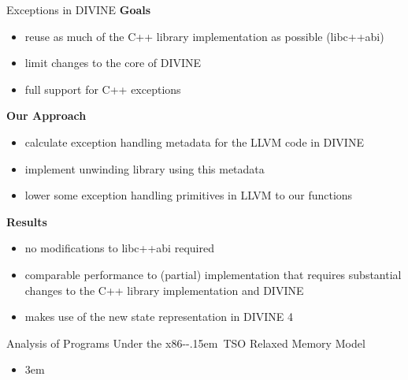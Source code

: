 \documentclass[aspectratio=169, fi]{paradise-slide}
\newcommand{\fcite}[1]{\emergencystretch 3em{\protect\NoHyper\cite{#1}}~\fullcite{#1}}
\newcommand{\xtso}{\mbox{x86-\kern-.15em TSO}\xspace}
\newenvironment{prespart}[1]{%
  \begin{frame}{}%
    \centering
      {\Large #1} \par\bigskip\bigskip%
}{%
  \end{frame}%
}
\begin{document}
\begin{frame}{Exceptions in DIVINE}
  \textbf{Goals}
  \begin{itemize}
    \item reuse as much of the C++ library implementation as possible (libc++abi)
    \item limit changes to the core of DIVINE
    \item full support for C++ exceptions
  \end{itemize}
  \pause

  \bigskip
  \textbf{Our Approach}
  \begin{itemize}
    \item calculate exception handling metadata for the LLVM code in DIVINE
    \item implement unwinding library using this metadata
    \item lower some exception handling primitives in LLVM to our functions
  \end{itemize}
  \pause

  \bigskip
  \textbf{Results}
  \begin{itemize}
    \item no modifications to libc++abi required
    \item comparable performance to (partial) implementation that requires substantial changes to
      the C++ library implementation and DIVINE
    \item makes use of the new state representation in DIVINE 4
  \end{itemize}
\end{frame}

\begin{prespart}{Analysis of Programs Under the \xtso Relaxed Memory Model}
  \begin{itemize}
    \item \fcite{SB2018x86tso}
  \end{itemize}
\end{prespart}
\end{document}
